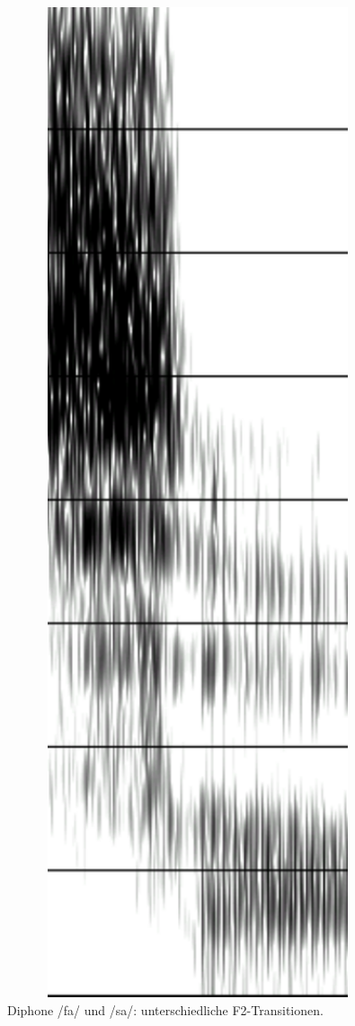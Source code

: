 \documentclass[11pt]{book}
\begin{document}
\begin{figure}
\begin{center}
\begin{minipage}[ct]{0.2\textwidth}
\end{minipage}
\hspace{2cm}
\begin{minipage}[ct]{0.2\textwidth}
\includegraphics[width=1\textwidth]{grafiken/sprachsynthese/sa}
\end{minipage}
\end{center}
\caption {Diphone /fa/ und /sa/: unterschiedliche F2-Transitionen.}
\end{figure}
 
\end{document}
